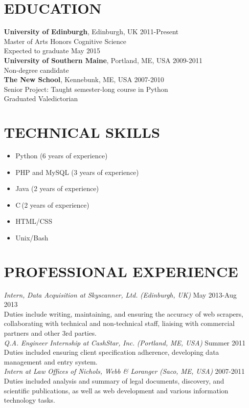\documentclass[line, margin]{res}
\newcommand{\CS}{C\nolinebreak\hspace{-.05em}\raisebox{.6ex}{\scriptsize\bf \#}}
\begin{document}
\address{24 Lutton Place\\ Edinburgh, Scotland EH8 9PE | 001 44 7719 663016 | chase@chasestevens.com}

\begin{resume}
\section{EDUCATION}
\textbf{University of Edinburgh}, Edinburgh, UK \hfill 2011-Present\\
Master of Arts Honors Cognitive Science \\
Expected to graduate May 2015 \\[5pt]
\textbf{University of Southern Maine}, Portland, ME, USA \hfill 2009-2011\\
Non-degree candidate\\[5pt]
\textbf{The New School}, Kennebunk, ME, USA \hfill 2007-2010\\
Senior Project: Taught semester-long course in Python \\
Graduated Valedictorian

\section{TECHNICAL SKILLS}
\begin{itemize}[leftmargin=10pt]
\item Python (6 years of experience)
\item PHP and MySQL (3 years of experience)
\item Java (2 years of experience)
\item \CS \,(2 years of experience)
\item HTML/CSS
\item Unix/Bash
\end{itemize}

\section{PROFESSIONAL EXPERIENCE}
\textit{Intern, Data Acquisition at Skyscanner, Ltd. (Edinburgh, UK)} \hfill May 2013-Aug 2013 \\
Duties include writing, maintaining, and ensuring the accuracy of web scrapers, collaborating with technical and non-technical staff, liaising with commercial partners and other 3rd parties.\\[5pt]
\textit{Q.A. Engineer Internship at CashStar, Inc. (Portland, ME, USA)} \hfill Summer 2011 \\
Duties included ensuring client specification adherence, developing data management and entry system.\\[5pt]
\textit{Intern at Law Offices of Nichols, Webb \& Loranger (Saco, ME, USA)} \hfill 2007-2011 \\
Duties included analysis and summary of legal documents, discovery, and scientific publications, as well as web development and various information technology tasks. 


\end{resume}
\end{document}
